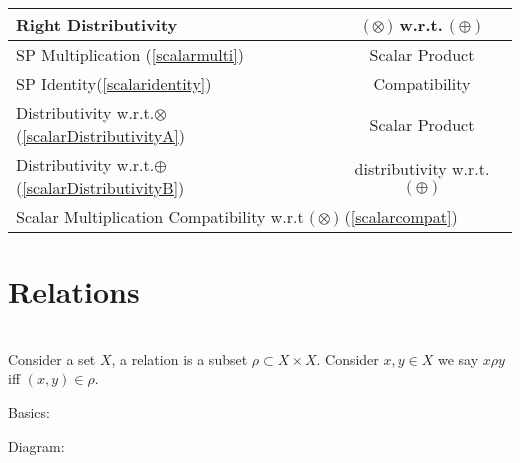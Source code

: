 \documentclass[a4paper,12pt]{scrartcl}    %
\newcommand{\OpA}{\otimes}
\newcommand{\OpB}{\oplus}
\begin{document}
\begin{landscape}
\begin{minipage}[t][]{0.60 \linewidth}
\begin{minipage}[c]{0,5\textwidth}
\begin{tabular}{|l|c|}
			    \cellcolor{blue!25} \footnotesize Right Distributivity & \tiny\cellcolor{yellow!25} $\big(\OpA\big)$ w.r.t. $\big(\OpB\big)$  \\
			   \hline
			  \hline
			     \cellcolor{blue!25} \footnotesize SP Multiplication (\ref{scalarmulti})&  \tiny\cellcolor{yellow!25}Scalar Product\\
			    \cellcolor{blue!25} \footnotesize SP Identity(\ref{scalaridentity}) & \tiny\cellcolor{yellow!25} Compatibility  \\
			   \hline 
			    \cellcolor{blue!25} \footnotesize Distributivity w.r.t.$\OpA$ (\ref{scalarDistributivityA})&  \tiny\cellcolor{yellow!25}Scalar Product\\
			    \cellcolor{blue!25} \footnotesize Distributivity w.r.t.$\OpB$ (\ref{scalarDistributivityB}) & \tiny\cellcolor{yellow!25} distributivity w.r.t. $\big(\OpB\big)$  \\
			   \hline
			    \multicolumn{2}{l}{\footnotesize \cellcolor{blue!25} Scalar Multiplication Compatibility w.r.t  $\big(\OpA\big)$ (\ref{scalarcompat})}\\
			   \hline
			\end{tabular}
			\vfill
		\end{minipage}
	\end{minipage}	


\newpage
	\begin{minipage}[t][]{0.30 \linewidth}
	    \section*{Relations}
	    \mbox{}\\
		Consider a set $X$, a relation is a subset $\rho \subset X \times X$.
		Consider $x,y \in X$ we say $x \rho y $ iff $(x,y)\in \rho$.
		
		Basics:
		
		
		Diagram:
			

\end{minipage}
\end{landscape}
\end{document}
